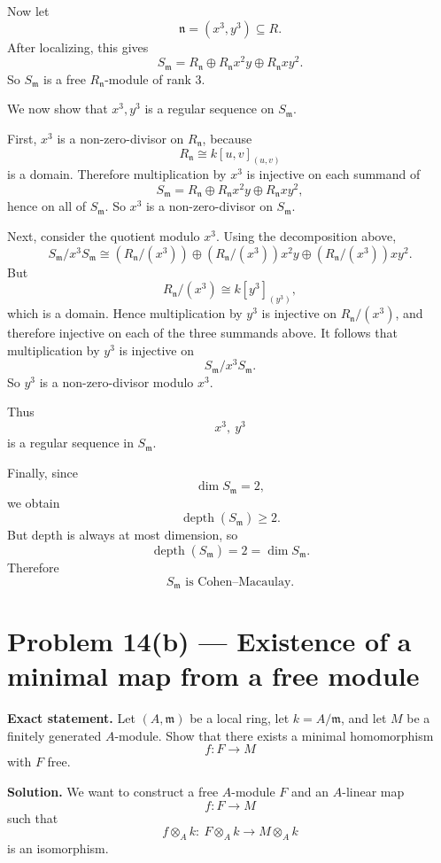 \documentclass[12pt,a4paper]{article}
\theoremstyle{plain}
\theoremstyle{definition}      %
\begin{document}
Now let
\[
\mathfrak n=(x^3,y^3)\subseteq R.
\]
After localizing, this gives
\[
S_{\mathfrak m}
=
R_{\mathfrak n}\oplus R_{\mathfrak n}x^2y \oplus R_{\mathfrak n}xy^2.
\]
So \(S_{\mathfrak m}\) is a free \(R_{\mathfrak n}\)-module of rank \(3\).

\medskip

We now show that \(x^3,y^3\) is a regular sequence on \(S_{\mathfrak m}\).

First, \(x^3\) is a non-zero-divisor on \(R_{\mathfrak n}\), because
\[
R_{\mathfrak n}\cong k[u,v]_{(u,v)}
\]
is a domain. Therefore multiplication by \(x^3\) is injective on each summand of
\[
S_{\mathfrak m}
=
R_{\mathfrak n}\oplus R_{\mathfrak n}x^2y \oplus R_{\mathfrak n}xy^2,
\]
hence on all of \(S_{\mathfrak m}\). So \(x^3\) is a non-zero-divisor on \(S_{\mathfrak m}\).

Next, consider the quotient modulo \(x^3\). Using the decomposition above,
\[
S_{\mathfrak m}/x^3S_{\mathfrak m}
\cong
(R_{\mathfrak n}/(x^3)) \oplus (R_{\mathfrak n}/(x^3))x^2y \oplus (R_{\mathfrak n}/(x^3))xy^2.
\]
But
\[
R_{\mathfrak n}/(x^3)
\cong
k[y^3]_{(y^3)},
\]
which is a domain. Hence multiplication by \(y^3\) is injective on \(R_{\mathfrak n}/(x^3)\), and therefore injective on each of the three summands above. It follows that multiplication by \(y^3\) is injective on
\[
S_{\mathfrak m}/x^3S_{\mathfrak m}.
\]
So \(y^3\) is a non-zero-divisor modulo \(x^3\).

Thus
\[
x^3,\ y^3
\]
is a regular sequence in \(S_{\mathfrak m}\).

Finally, since
\[
\dim S_{\mathfrak m}=2,
\]
we obtain
\[
\operatorname{depth}(S_{\mathfrak m})\ge 2.
\]
But depth is always at most dimension, so
\[
\operatorname{depth}(S_{\mathfrak m})=2=\dim S_{\mathfrak m}.
\]
Therefore
\[
\boxed{S_{\mathfrak m}\text{ is Cohen--Macaulay}.}
\]
	
\section*{Problem 14(b) --- Existence of a minimal map from a free module}

\textbf{Exact statement.}
Let \((A,\mathfrak m)\) be a local ring, let \(k=A/\mathfrak m\), and let \(M\) be a finitely generated \(A\)-module. Show that there exists a minimal homomorphism
\[
f:F\to M
\]
with \(F\) free.

\textbf{Solution.}
We want to construct a free \(A\)-module \(F\) and an \(A\)-linear map
\[
f:F\to M
\]
such that
\[
f\otimes_A k:\ F\otimes_A k \to M\otimes_A k
\]
is an isomorphism.
\end{document}
